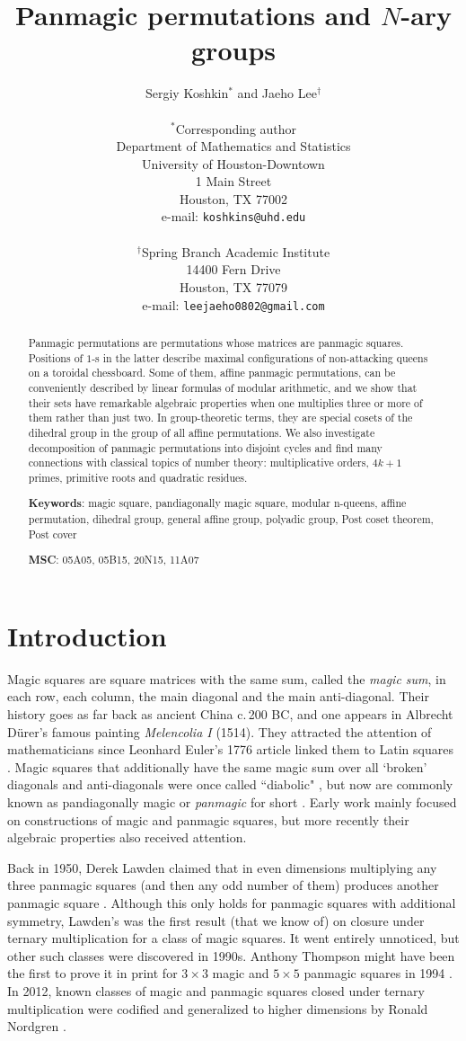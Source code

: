\documentclass[11pt]{article}
\title{Panmagic permutations and $N$-ary groups}
\author{Sergiy Koshkin$^*$ and Jaeho Lee$^\dagger$\\
\\
$^*$Corresponding author\\
Department of Mathematics and Statistics\\
University of Houston-Downtown\\
1 Main Street\\
Houston, TX 77002\\
e-mail: \texttt{koshkins@uhd.edu}
\\
\\
$^\dagger$Spring Branch Academic Institute\\
14400 Fern Drive\\
Houston, TX 77079\\
e-mail: \texttt{leejaeho0802@gmail.com} 
}
\date{}
\theoremstyle{plain}
\theoremstyle{definition}
\newcommand{\+}[1]{{#1}^\times}
\begin{document}
\maketitle

\begin{abstract}
Panmagic permutations are permutations whose matrices are panmagic squares. Positions of $1$-s in the latter describe maximal configurations of non-attacking queens on a toroidal chessboard. Some of them, affine panmagic permutations, can be conveniently described by linear formulas of modular arithmetic, and we show that their sets have remarkable algebraic properties when one multiplies three or more of them rather than just two. In group-theoretic terms, they are special cosets of the dihedral group in the group of all affine permutations. We also investigate decomposition of panmagic permutations into disjoint cycles and find many connections with classical topics of number theory: multiplicative orders, $4k+1$ primes, primitive roots and quadratic residues.
\medskip

\textbf{Keywords}: magic square, pandiagonally magic square, modular n-queens, affine permutation, dihedral group, general affine group, polyadic group, Post coset theorem, Post cover
\medskip

\textbf{MSC}: 05A05, 05B15, 20N15, 11A07 
\end{abstract}

\section{Introduction}

Magic squares are square matrices with the same sum, called the {\it magic sum}, in each row, each column, the main diagonal and the main anti-diagonal. Their history goes as far back as ancient China c.\,200 BC, and one appears in Albrecht  D\"urer's famous painting {\it Melencolia I} (1514). They attracted the attention of mathematicians since Leonhard Euler's 1776 article linked them to Latin squares \cite{BS2}. Magic squares that additionally have the same magic sum over all `broken' diagonals and anti-diagonals were once called ``diabolic" \cite{Lehm}, but now are commonly known as pandiagonally magic or {\it panmagic} for short \cite{AlKi,BS1}. Early work mainly focused on constructions of magic and panmagic squares, but more recently their algebraic properties also received attention. 

Back in 1950, Derek Lawden claimed that in even dimensions multiplying any three panmagic squares (and then any odd number of them) produces another panmagic square \cite{Lawd}. Although this only holds for panmagic squares with additional symmetry, Lawden's was the first result (that we know of) on closure under ternary multiplication for a class of magic squares. It went entirely unnoticed, but other such classes were discovered in 1990s. Anthony Thompson might have been the first to prove it in print for $3\times3$ magic and $5\times5$ panmagic squares in 1994 \cite{Thom}. In 2012, known classes of magic and panmagic squares closed under ternary multiplication were codified and generalized to higher dimensions by Ronald Nordgren \cite{Nord}. 
\end{document}
